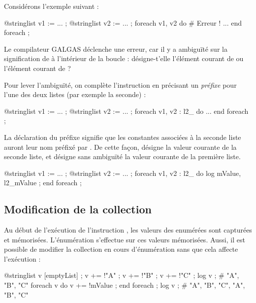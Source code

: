 
Considérons l'exemple suivant :

\begin{galgascode}
@stringlist v1 := ... ;
@stringlist v2 := ... ;
foreach v1, v2 do # Erreur !
 ...
end foreach ;
\end{galgascode}

Le compilateur GALGAS déclenche une erreur, car il y a ambiguïté sur la signification de  à l'intérieur de la boucle : désigne-t'elle l'élément courant de  ou l'élément courant de  ?

Pour lever l'ambiguïté, on complète l'instruction en précisant un \emph{préfixe} pour l'une des deux listes (par exemple la seconde) :
\begin{galgascode}
@stringlist v1 := ... ;
@stringlist v2 := ... ;
foreach v1, v2 : l2_ do
  ...
end foreach ;
\end{galgascode}

La déclaration du préfixe  signifie que les constantes associées à la seconde liste auront leur nom préfixé par . De cette façon,  désigne la valeur courante de la seconde liste, et  désigne sans ambiguïté la valeur courante de la première liste.
\begin{galgascode}
@stringlist v1 := ... ;
@stringlist v2 := ... ;
foreach v1, v2 : l2_ do
  log mValue, l2_mValue ;
end foreach ;
\end{galgascode}

\subsection{Modification de la collection}

Au début de l'exécution de l'instruction , les valeurs des  enumérées sont capturées et mémorisées. L'énumération s'effectue sur ces valeurs mémorisées. Aussi, il est possible de modifier la collection en cours d'énumération sans que cela affecte l'exécution :
\begin{galgascode}
@stringlist v [emptyList] ;
v += !"A" ;
v += !"B" ;
v += !"C" ;
log v ; # "A", "B", "C"
foreach v do
  v += !mValue ;
end foreach ;
log v ; # "A", "B", "C", "A", "B", "C"
\end{galgascode}





